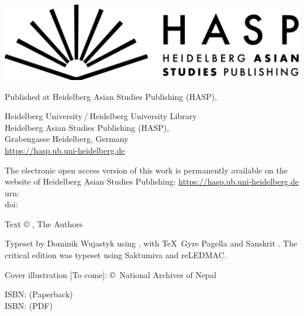 \documentclass[11pt]{book} %
\begin{document}
\begin{titlepage}
\begin{footnotesize}
\includegraphics[width=.4\linewidth]{media/HASP_horizontal_black}

\medskip
Published at Heidelberg Asian Studies Publishing (HASP), 

\medskip

Heidelberg University / Heidelberg University Library\\
Heidelberg Asian Studies Publishing (HASP),\\
Grabengasse  Heidelberg, Germany\\
\href{https://hasp.ub.uni-heidelberg.de}{https://hasp.ub.uni-heidelberg.de}

\bigskip

The electronic open access version of this work is permanently available on the 
website of 
Heidelberg Asian Studies Publishing: 
\href{https://hasp.ub.uni-heidelberg.de}{https://hasp.ub.uni-heidelberg.de}\\
urn: \\
doi: 
\href{https://doi.org/10.11588/hasp.1203}{}
\medskip


Text © , The Authors
\medskip

Typeset by Dominik Wujastyk using \XeLaTeX, with \TeX\ Gyre
Pagella and Sanskrit . The critical edition was typeset using 
Saktumiva and reLEDMAC.
\medskip

Cover illustration [To come]: \copyright\ National Archives of Nepal

\medskip

ISBN:  (Paperback)\\
ISBN:  (PDF)

\end{footnotesize}


\newpage
\end{titlepage}

    
\thispagestyle{empty}
\setcounter{page}{5}
 
    \tableofcontents
    \pagestyle{fancy}
    
    \newpage

   
    
  
   
     
     
     
    
        \cleardoublepage
    
        \setcounter{page}{46}
     

        \setcounter{page}{57}
     
     

    
\end{document}
